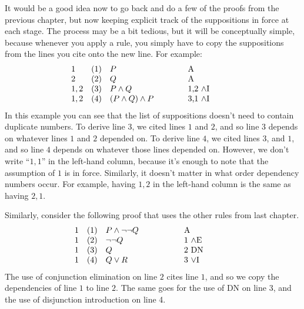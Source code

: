 It would be a good idea now to go back and do a few of the proofs from
the previous chapter, but now keeping explicit track of the
suppositions in force at each stage.  The process may be a bit
tedious, but it will be conceptually simple, because whenever you
apply a rule, you simply have to copy the suppositions from the lines
you cite onto the new line.  For example:
\[ \begin{array}{l l >{$}p{3cm}<{$} p{2cm}}
     1 & (1) & P & A \\
     2 & (2) & Q & A \\
     1,2 & (3) & P\wedge Q & 1,2 $\wedge$I \\
 1,2 & (4) & (P\wedge Q)\wedge P & 3,1 $\wedge$I  \end{array} \]
In this example you can see that the list of suppositions doesn't need
to contain duplicate numbers.  To derive line $3$, we cited lines $1$
and $2$, and so line $3$ depends on whatever lines $1$ and $2$
depended on.  To derive line $4$, we cited lines $3$, and $1$, and
so line $4$ depends on whatever those lines depended on.  However, we don't write ``$1,1$'' in the left-hand
column, because it's enough to note that the assumption of $1$ is in force.
Similarly, it doesn't matter in what order dependency numbers occur.  For
example, having $1,2$ in the left-hand column is the same as having
$2,1$.

Similarly, consider the following proof that uses the other rules from
last chapter.
\[ \begin{array}{l l >{$}p{3cm}<{$} p{2cm}}
     1 & (1) & P\wedge \neg\neg Q & A \\
     1 & (2) & \neg\neg Q & 1 $\wedge$E \\
     1 & (3) & Q          & 2 DN \\
     1 & (4) & Q\vee R    & 3 $\vee$I \end{array} \]
The use of conjunction elimination on line $2$ cites line $1$, and
so we copy the dependencies of line $1$ to line $2$.  The same goes
for the use of DN on line 3, and the use of disjunction introduction
on line 4. 

